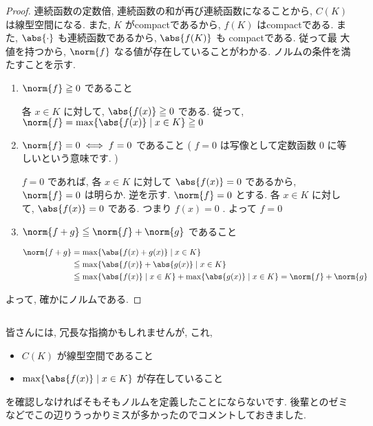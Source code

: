 \documentclass[a4paper,10pt,fleqn]{ltjsarticle}
\begin{document}
\begin{leftbar}
    \begin{proof}
        連続函数の定数倍, 連続函数の和が再び連続函数になることから, $C ( K )$ は線型空間になる. また, $K$ がcompactであるから, $f ( K )$ はcompactである. また, $\abs{ \cdot }$ も連続函数であるから, $\abs{ f ( K ) }$ も compactである. 従って最
        大値を持つから, $\norm{ f }$ なる値が存在していることがわかる. ノルムの条件を満たすことを示す.
        \begin{enumerate}
            \item $\norm{ f } \geq 0$ であること

                  \zw 各 $x \in K$ に対して, $\abs{f ( x ) } \geq 0$ である. 従って, $\norm{ f } = \max \{ \abs{ f ( x )} \mid x \in K \} \geq 0$

            \item $\norm{ f } = 0 \iff  f = 0$ であること ( $f = 0$ は写像として定数函数 $0$ に等しいという意味です. )

                  $f = 0$ であれば, 各 $x \in K$ に対して $\abs{ f ( x ) } = 0$ であるから, $\norm{ f } = 0$ は明らか. 逆を示す. $\norm{ f } = 0$ とする. 各 $x \in K$ に対して, $\abs{ f ( x ) } = 0$ である. つまり $f ( x ) = 0$ . よって $f = 0$

            \item $\norm{ f + g } \leq \norm{ f } + \norm{ g }$ であること

                  \begin{align*}
                      \norm{ f + g } & =  \max \{ \abs{ f ( x ) + g ( x )} \mid x \in K \}                                                                   \\
                                     & \leq  \max \{ \abs{ f ( x ) } + \abs{ g ( x ) } \mid x \in K \}                                                       \\
                                     & \leqq   \max \{ \abs{ f ( x ) }  \mid x \in K \} + \max \{ \abs{ g ( x ) }  \mid x \in K \} = \norm{ f } + \norm{ g }
                  \end{align*}
        \end{enumerate}
        よって, 確かにノルムである.
    \end{proof}
\end{leftbar}

\begin{column}
    皆さんには, 冗長な指摘かもしれませんが, これ,
    \begin{itemize}
        \item $C ( K )$ が線型空間であること
        \item $\max \{ \abs{ f ( x )} \mid x \in K \}$ が存在していること
    \end{itemize}
    を確認しなければそもそもノルムを定義したことにならないです. 後輩とのゼミなどでこの辺りうっかりミスが多かったのでコメントしておきました.
\end{column}
\end{document}
